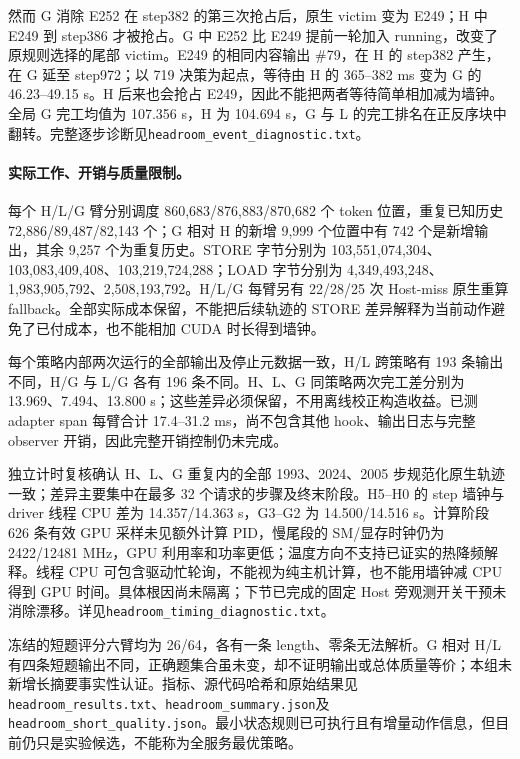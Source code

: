 \documentclass[UTF8,fontset=fandol,a4paper,10pt]{ctexart}
\newcommand{\code}[1]{\nolinkurl{#1}}
\begin{document}
然而 G 消除 E252 在 step382 的第三次抢占后，原生 victim 变为 E249；H 中 E249 到 step386 才被抢占。G 中 E252 比 E249 提前一轮加入 running，改变了原规则选择的尾部 victim。E249 的相同内容输出 \#79，在 H 的 step382 产生，在 G 延至 step972；以 719 决策为起点，等待由 H 的 365--382 ms 变为 G 的 46.23--49.15 s。H 后来也会抢占 E249，因此不能把两者等待简单相加减为墙钟。全局 G 完工均值为 107.356 s，H 为 104.694 s，G 与 L 的完工排名在正反序块中翻转。完整逐步诊断见\code{headroom_event_diagnostic.txt}。

\paragraph{实际工作、开销与质量限制。}
每个 H/L/G 臂分别调度 860,683/876,883/870,682 个 token 位置，重复已知历史 72,886/89,487/82,143 个；G 相对 H 的新增 9,999 个位置中有 742 个是新增输出，其余 9,257 个为重复历史。STORE 字节分别为 103,551,074,304、103,083,409,408、103,219,724,288；LOAD 字节分别为 4,349,493,248、1,983,905,792、2,508,193,792。H/L/G 每臂另有 22/28/25 次 Host-miss 原生重算 fallback。全部实际成本保留，不能把后续轨迹的 STORE 差异解释为当前动作避免了已付成本，也不能相加 CUDA 时长得到墙钟。

每个策略内部两次运行的全部输出及停止元数据一致，H/L 跨策略有 193 条输出不同，H/G 与 L/G 各有 196 条不同。H、L、G 同策略两次完工差分别为 13.969、7.494、13.800 s；这些差异必须保留，不用离线校正构造收益。已测 adapter span 每臂合计 17.4--31.2 ms，尚不包含其他 hook、输出日志与完整 observer 开销，因此完整开销控制仍未完成。

独立计时复核确认 H、L、G 重复内的全部 1993、2024、2005 步规范化原生轨迹一致；差异主要集中在最多 32 个请求的步骤及终末阶段。H5--H0 的 step 墙钟与 driver 线程 CPU 差为 14.357/14.363 s，G3--G2 为 14.500/14.516 s。计算阶段 626 条有效 GPU 采样未见额外计算 PID，慢尾段的 SM/显存时钟仍为 2422/12481 MHz，GPU 利用率和功率更低；温度方向不支持已证实的热降频解释。线程 CPU 可包含驱动忙轮询，不能视为纯主机计算，也不能用墙钟减 CPU 得到 GPU 时间。具体根因尚未隔离；下节已完成的固定 Host 旁观测开关干预未消除漂移。详见\code{headroom_timing_diagnostic.txt}。

冻结的短题评分六臂均为 26/64，各有一条 length、零条无法解析。G 相对 H/L 有四条短题输出不同，正确题集合虽未变，却不证明输出或总体质量等价；本组未新增长摘要事实性认证。指标、源代码哈希和原始结果见\code{headroom_results.txt}、\code{headroom_summary.json}及\code{headroom_short_quality.json}。最小状态规则已可执行且有增量动作信息，但目前仍只是实验候选，不能称为全服务最优策略。
\end{document}

